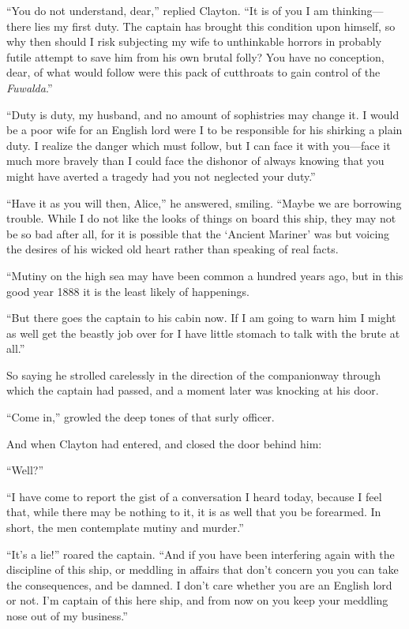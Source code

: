 “You do not understand, dear,” replied Clayton. “It is of you I am thinking—there lies my first duty. The captain has brought this condition upon himself, so why then should I risk subjecting my wife to unthinkable horrors in probably futile attempt to save him from his own brutal folly? You have no conception, dear, of what would follow were this pack of cutthroats to gain control of the \emph{Fuwalda}.”

“Duty is duty, my husband, and no amount of sophistries may change it. I would be a poor wife for an English lord were I to be responsible for his shirking a plain duty. I realize the danger which must follow, but I can face it with you—face it much more bravely than I could face the dishonor of always knowing that you might have averted a tragedy had you not neglected your duty.”

“Have it as you will then, Alice,” he answered, smiling. “Maybe we are borrowing trouble. While I do not like the looks of things on board this ship, they may not be so bad after all, for it is possible that the ‘Ancient Mariner’ was but voicing the desires of his wicked old heart rather than speaking of real facts.

“Mutiny on the high sea may have been common a hundred years ago, but in this good year 1888 it is the least likely of happenings.

“But there goes the captain to his cabin now. If I am going to warn him I might as well get the beastly job over for I have little stomach to talk with the brute at all.”

So saying he strolled carelessly in the direction of the companionway through which the captain had passed, and a moment later was knocking at his door.

“Come in,” growled the deep tones of that surly officer.

And when Clayton had entered, and closed the door behind him:

“Well?”

“I have come to report the gist of a conversation I heard today, because I feel that, while there may be nothing to it, it is as well that you be forearmed. In short, the men contemplate mutiny and murder.”

“It’s a lie!” roared the captain. “And if you have been interfering again with the discipline of this ship, or meddling in affairs that don’t concern you you can take the consequences, and be damned. I don’t care whether you are an English lord or not. I’m captain of this here ship, and from now on you keep your meddling nose out of my business.”

